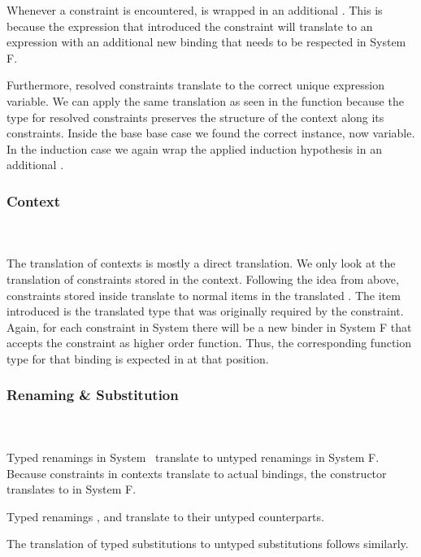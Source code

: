 \noindent Whenever a constraint is encountered,  is wrapped in an additional . 
This is because the expression that introduced the constraint will translate to an expression with an additional new binding that needs to be respected in System F.

\noindent Furthermore, resolved constraints translate to the correct unique expression variable. We can apply the same translation as seen in the function  because the type for resolved constraints \Data{[}  \Data{]∈}  preserves the structure of the context along its constraints. 
\DPTOVar
Inside the base base case we found the correct instance, now variable.
In the induction case  we again wrap the applied induction hypothesis in an additional .
\subsubsection{Context}\hfill\\\\
The translation of contexts is mostly a direct translation. 
We only look at the translation of constraints stored in the context.
\DPTCtx
Following the idea from above, constraints  \Constr{:}  stored inside  translate to normal items in the translated . 
The item introduced is the translated type   that was originally required by the constraint. Again, for each constraint in System \Fo there will be a new binder in System F that accepts the constraint as higher order function. 
Thus, the corresponding function type for that binding is expected in  at that position.

\subsubsection{Renaming \& Substitution}\hfill\\\\
Typed renamings in System \Fo\ translate to untyped renamings in System F.
\DPTRen
\noindent Because constraints in contexts translate to actual bindings, the constructor  translates to  in System F.

\noindent Typed renamings ,  and  translate to their untyped counterparts. 

\noindent The translation of typed substitutions to untyped substitutions follows similarly.
\DPTSub 

